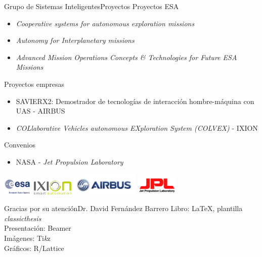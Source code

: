 \documentclass[10pt,compress]{beamer} %
\begin{document}
\begin{frame}{Grupo de Sistemas Inteligentes}{Proyectos}
    Proyectos ESA
        \begin{itemize}
            \item \textit{Cooperative systems for autonomous exploration missions}
            \item \textit{Autonomy for Interplanetary missions}
            \item \textit{Advanced Mission Operations Concepts \& Technologies for Future ESA Missions}
        \end{itemize}
    Proyectos empresas
        \begin{itemize}
        \item SAVIERX2: Demostrador de tecnologías de interacción hombre-máquina con UAS - AIRBUS
        \item \textit{COLlaborative Vehicles autonomous EXploration System (COLVEX)} - IXION
        \end{itemize}
     Convenios
        \begin{itemize}
            \item NASA - \textit{Jet Propulsion Laboratory}
        \end{itemize}
     \centering
     \smallskip 
     \includegraphics[height=25pt]{figs/esalogo}
     \quad
    \includegraphics[height=20pt]{figs/ixionlogo}
    \quad
    \includegraphics[height=30pt]{figs/airbuslogo}     
    \quad
    \includegraphics[height=25pt]{figs/jpllogo}

    \note{
    }  
\end{frame}

{
    \sectionheaderWhite %
    \begin{frame}[plain]{Gracias por su atención}{Dr. David Fernández Barrero}
    \small{
    Libro: \LaTeX, plantilla \textit{classicthesis}\\
    Presentación: Beamer\\
    Imágenes: Ti\emph{k}z\\
    Gráficos: R/Lattice
    }
    \end{frame}
}
\end{document}
